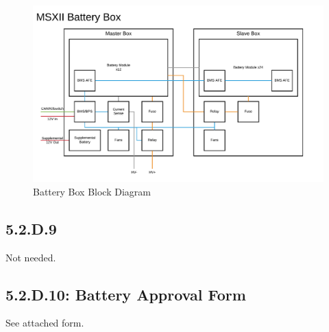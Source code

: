 \documentclass[10pt]{article}
\begin{document}
\begin{figure}[H]
  \centering
  \includegraphics[width=\textwidth,page=4]{figures/msxii-block-diagrams}
  \caption{Battery Box Block Diagram}
  \label{fig:battery-box-block-diagram}
\end{figure}

\subsection{5.2.D.9}

Not needed.

\subsection{5.2.D.10: Battery Approval Form}

See attached form.


\end{document}
